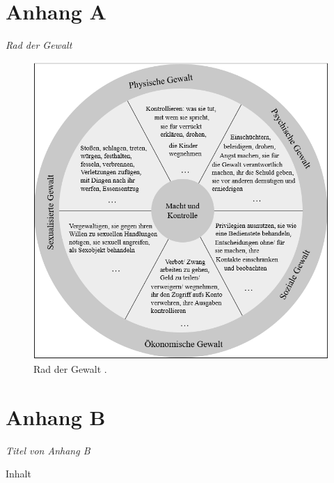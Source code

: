 \begin{appendices}
    \chapter*{Anhang A}
    \noindent \textit{Rad der Gewalt}
    
    \begin{figure}[htb]
        \centering
            \includegraphics[width=0.8\linewidth]{Rad der Gewalt.png}
            \caption[Rad der Gewalt]{Rad der Gewalt \parencite{Rad_der_Gewalt}.}
            \label{Rad der Gewalt}
    \end{figure}


    \chapter*{Anhang B}
    \noindent \textit{Titel von Anhang B}

    Inhalt
\end{appendices}




